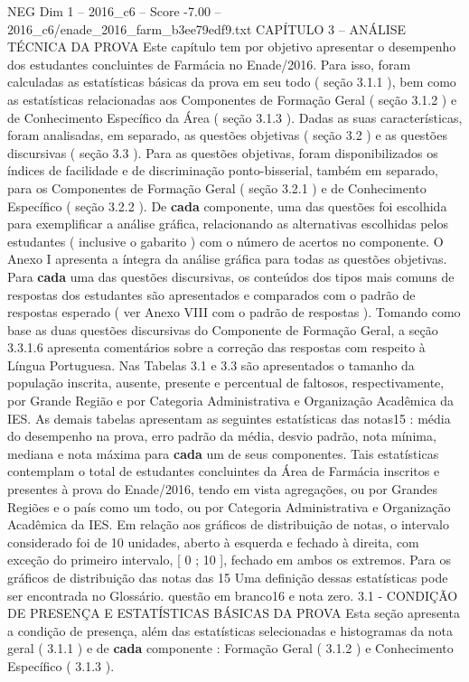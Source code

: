 \begin{textsample}{NEG Dim 1 – 2016\_c6 – Score -7.00 – 2016\_c6/enade\_2016\_farm\_b3ee79edf9.txt}  \label{ex:f1_neg_043}
CAPÍTULO 3 – ANÁLISE TÉCNICA DA PROVA Este capítulo tem por objetivo apresentar o desempenho dos estudantes concluintes de Farmácia no Enade/2016.
Para isso, foram calculadas as estatísticas básicas da prova em seu todo ( seção 3.1.1 ), bem como as estatísticas relacionadas aos Componentes de Formação Geral ( seção 3.1.2 ) e de Conhecimento Específico da Área ( seção 3.1.3 ).
Dadas as suas características, foram analisadas, em separado, as questões objetivas ( seção 3.2 ) e as questões discursivas ( seção 3.3 ).
Para as questões objetivas, foram disponibilizados os índices de facilidade e de discriminação ponto-bisserial, também em separado, para os Componentes de Formação Geral ( seção 3.2.1 ) e de Conhecimento Específico ( seção 3.2.2 ).
De \textbf{cada} componente, uma das questões foi escolhida para exemplificar a análise gráfica, relacionando as alternativas escolhidas pelos estudantes ( inclusive o gabarito ) com o número de acertos no componente.
O Anexo I apresenta a íntegra da análise gráfica para todas as questões objetivas.
Para \textbf{cada} uma das questões discursivas, os conteúdos dos tipos mais comuns de respostas dos estudantes são apresentados e comparados com o padrão de respostas esperado ( ver Anexo VIII com o padrão de respostas ).
Tomando como base as duas questões discursivas do Componente de Formação Geral, a seção 3.3.1.6 apresenta comentários sobre a correção das respostas com respeito à Língua Portuguesa.
Nas Tabelas 3.1 e 3.3 são apresentados o tamanho da população inscrita, ausente, presente e percentual de faltosos, respectivamente, por Grande Região e por Categoria Administrativa e Organização Acadêmica da IES.
As demais tabelas apresentam as seguintes estatísticas das notas15 : média do desempenho na prova, erro padrão da média, desvio padrão, nota mínima, mediana e nota máxima para \textbf{cada} um de seus componentes.
Tais estatísticas contemplam o total de estudantes concluintes da Área de Farmácia inscritos e presentes à prova do Enade/2016, tendo em vista agregações, ou por Grandes Regiões e o país como um todo, ou por Categoria Administrativa e Organização Acadêmica da IES.
Em relação aos gráficos de distribuição de notas, o intervalo considerado foi de 10 unidades, aberto à esquerda e fechado à direita, com exceção do primeiro intervalo, [ 0 ; 10 ], fechado em ambos os extremos.
Para os gráficos de distribuição das notas das 15 Uma definição dessas estatísticas pode ser encontrada no Glossário. questão em branco16 e nota zero. 3.1 - CONDIÇÃO DE PRESENÇA E ESTATÍSTICAS BÁSICAS DA PROVA Esta seção apresenta a condição de presença, além das estatísticas selecionadas e histogramas da nota geral ( 3.1.1 ) e de \textbf{cada} componente : Formação Geral ( 3.1.2 ) e Conhecimento Específico ( 3.1.3 ).

\end{textsample}

